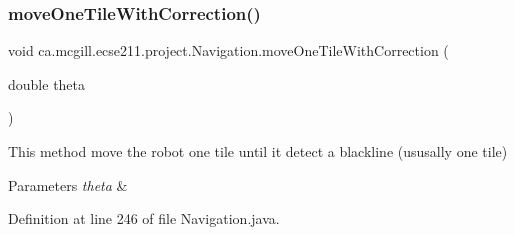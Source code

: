 \subsubsection{\texorpdfstring{move\+One\+Tile\+With\+Correction()}{moveOneTileWithCorrection()}}
{\footnotesize\ttfamily void ca.\+mcgill.\+ecse211.\+project.\+Navigation.\+move\+One\+Tile\+With\+Correction (\begin{DoxyParamCaption}\item[{double}]{theta }\end{DoxyParamCaption})}

This method move the robot one tile until it detect a blackline (ususally one tile)


\begin{DoxyParams}{Parameters}
{\em theta} & \\
\hline
\end{DoxyParams}


Definition at line 246 of file Navigation.\+java.



